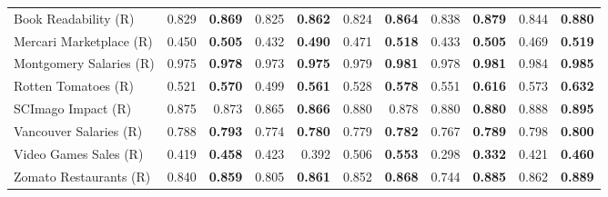 \begin{tabular}{lrrrrrrrrrr}
Book Readability (R) & 0.829 & \textbf{0.869} & 0.825 & \textbf{0.862} & 0.824 & \textbf{0.864} & 0.838 & \textbf{0.879} & 0.844 & \textbf{0.880} \\
Mercari Marketplace (R) & 0.450 & \textbf{0.505} & 0.432 & \textbf{0.490} & 0.471 & \textbf{0.518} & 0.433 & \textbf{0.505} & 0.469 & \textbf{0.519} \\
Montgomery Salaries (R) & 0.975 & \textbf{0.978} & 0.973 & \textbf{0.975} & 0.979 & \textbf{0.981} & 0.978 & \textbf{0.981} & 0.984 & \textbf{0.985} \\
Rotten Tomatoes (R) & 0.521 & \textbf{0.570} & 0.499 & \textbf{0.561} & 0.528 & \textbf{0.578} & 0.551 & \textbf{0.616} & 0.573 & \textbf{0.632} \\
SCImago Impact (R) & 0.875 & 0.873 & 0.865 & \textbf{0.866} & 0.880 & 0.878 & 0.880 & \textbf{0.880} & 0.888 & \textbf{0.895} \\
Vancouver Salaries (R) & 0.788 & \textbf{0.793} & 0.774 & \textbf{0.780} & 0.779 & \textbf{0.782} & 0.767 & \textbf{0.789} & 0.798 & \textbf{0.800} \\
Video Games Sales (R) & 0.419 & \textbf{0.458} & 0.423 & 0.392 & 0.506 & \textbf{0.553} & 0.298 & \textbf{0.332} & 0.421 & \textbf{0.460} \\
Zomato Restaurants (R) & 0.840 & \textbf{0.859} & 0.805 & \textbf{0.861} & 0.852 & \textbf{0.868} & 0.744 & \textbf{0.885} & 0.862 & \textbf{0.889} \\
\bottomrule
\end{tabular}
